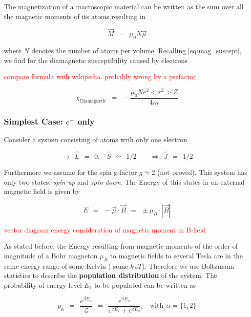 \documentclass[10pt]{report}
\numberwithin{equation}{chapter}
\begin{document}
The magnetization of a macroscopic material can be written as the sum over all the magnetic moments of its atoms resulting in

\begin{equation}
  \vec{M} ~~=~~ \mu_0 N \vec{\mu}
\end{equation}

where $N$ denotes the number of atoms per volume. Recalling \ref{eq:mag_suscept}, we find for the diamagnetic susceptibility caused by electrons

\textcolor{red}{compare formula with wikipedia. probably wrong by a prefactor}

\begin{equation}
  \chi_\text{Diamagnetic} ~~=~~ -\frac{\mu_0 N e^2 <r^2> Z}{4m}
\end{equation}


\subsubsection{Simplest Case: $e^-$ only}

Consider a system consisting of atoms with only one electron

\begin{equation}
  \rightarrow ~~ \hat{L} ~~=~~0, ~~~~ \hat{S} ~~≃~~ 1/2 ~~~~~~~~~\Rightarrow ~~ \hat{J} ~~=~~ 1/2
\end{equation}

Furthermore we assume for the spin g-factor $g \simeq 2$ (not proved). This system has only two states: \textit{spin-up} and \textit{spin-down}.
The Energy of this states in an external magnetic field is given by

\begin{equation}
  E ~~=~~ - \vec{\mu} \cdot \vec{B} ~~=~~ \pm \mu_B \cdot |\vec{B}|
\end{equation}

\textcolor{red}{ vector diagram energy consideration of magnetic moment in B-field}

As stated before, the Energy resulting from magnetic moments of the order of magnitude of a Bohr magneton $\mu_B$ to magnetic fields to several Tesla are in the same energy range of some Kelvin ( some $k_B T$). Therefore we use Boltzmann statistics to describe the \textbf{population distribution} of the system. The probability of energy level $E_1$ to be populated can be written as

\begin{equation}
  p_\alpha ~~=~~ \frac{e^{\beta E_\alpha}}{\mathcal{Z}} ~~=~~ \frac{e^{\beta E_\alpha}}{e^{\beta E_1} + e^{\beta E_2}}, ~~~~ \text{with} ~~ \alpha = \{1,2\}
\end{equation}
\end{document}
